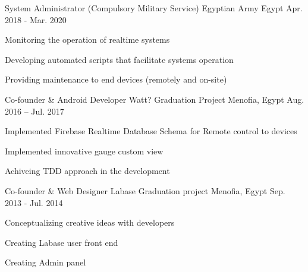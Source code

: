 

\begin{cventries}

\cventry
{System Administrator (Compulsory Military Service)} %
{Egyptian Army} %
{Egypt} %
{Apr. 2018 - Mar. 2020} %
{
  \begin{cvitems} %
    \item {Monitoring the operation of realtime systems}
    \item {Developing automated scripts that facilitate systems operation}
    \item {Providing maintenance to end devices (remotely and on-site)}
  \end{cvitems}
}


  \cventry
    {Co-founder \& Android Developer} %
    {Watt? Graduation Project} %
    {Menofia, Egypt} %
    {Aug. 2016 – Jul. 2017} %
    {
      \begin{cvitems} %
        \item {Implemented Firebase Realtime Database Schema for Remote control to devices}
        \item {Implemented innovative gauge custom view}
        \item {Achiveing TDD approach in the development}
      \end{cvitems}
    }

\cventry
{Co-founder \& Web Designer} %
{Labase Graduation project} %
{Menofia, Egypt} %
{Sep. 2013 - Jul. 2014} %
{
  \begin{cvitems} %
    \item {Conceptualizing creative ideas with developers}
    \item {Creating Labase user front end}
    \item {Creating Admin panel}
  \end{cvitems}
}

\end{cventries}
